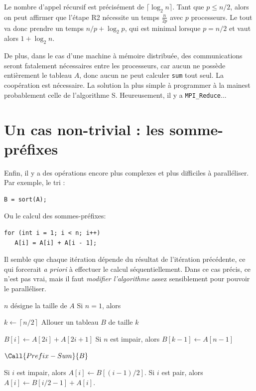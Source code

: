 Le nombre d'appel récursif est précisément de $\lceil \log_2 n \rceil$. Tant que
$p \leq n/2$, alors on peut affirmer que l'étape R2 nécessite un temps
$\frac{n}{2p}$ avec $p$ processeurs. Le tout va donc prendre un temps
$n/p + \log_2 p$, qui est minimal lorsque $p=n/2$ et vaut alors $1 + \log_2 n$.

De plus, dans le cas d'une machine à mémoire distribuée, des communications
seront fatalement nécessaires entre les processeurs, car aucun ne possède
entièrement le tableau $A$, donc aucun ne peut calculer \verb|sum| tout seul. La
coopération est nécessaire. La solution la plus simple à programmer \og à la
main\fg est probablement celle de l'algorithme S. Heureusement, il y a
\verb|MPI_Reduce|... 

\section{Un cas non-trivial : les somme-préfixes}

Enfin, il y a des opérations encore plus complexes et plus difficiles à
paralléliser. Par exemple, le tri :
\begin{verbatim}
B = sort(A);
\end{verbatim}

Ou le calcul des \og sommes-préfixes\fg :
\begin{verbatim}
for (int i = 1; i < n; i++)
   A[i] = A[i] + A[i - 1];
\end{verbatim}

Il semble que chaque itération dépende du résultat de l'itération précédente, ce
qui forcerait \textit{a priori} à effectuer le calcul séquentiellement. Dans ce
cas précis, ce n'est pas vrai, mais il faut \emph{modifier l'algorithme} assez
sensiblement pour pouvoir le paralléliser.

\medskip
\begin{algorithmic}[1]

  \State $n$ désigne la taille de $A$
  \State Si $n = 1$, alors \Return

  \State $k \gets \left\lceil n/2\right\rceil$
  \State Allouer un tableau $B$ de taille $k$

  \ParallelFor[$0 \leq i < n / 2$]
    \State $B[i] \gets A[2i] + A[2i+1]$
  \EndParallelFor
  \State Si $n$ est impair, alors $B[k - 1] \gets A[n - 1]$

  \State $\Call{Prefix-Sum}{B}$

  \ParallelFor[$1 \leq i < n$]
  \State Si $i$ est impair, alors $A[i] \gets B[(i-1)/2]$.
  \State Si $i$ est pair, alors $A[i] \gets B[i/2-1] + A[i]$.

  \EndParallelFor

  \EndFunction
\end{algorithmic}


